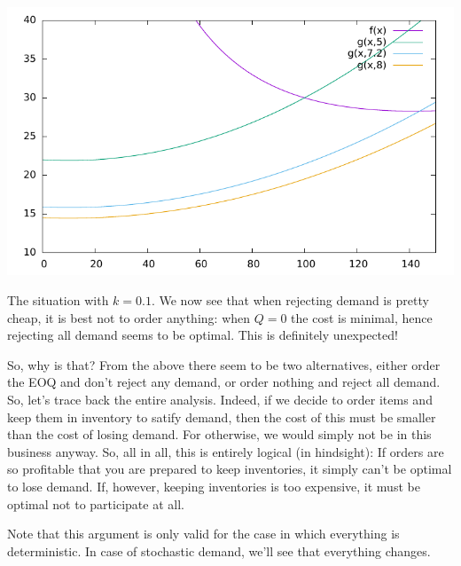 \begin{question}
\begin{solution}
\begin{center}
  \includegraphics{figures/eoq_loss_0_1}
\end{center}

The situation with $k=0.1$. We now see that when rejecting demand is
pretty cheap, it is best not to order anything: when $Q=0$ the cost is
minimal, hence rejecting all demand seems to be optimal. This is
definitely unexpected!

So, why is that? From the above there seem to be two alternatives,
either order the EOQ and don't reject any demand, or order nothing and
reject all demand.  So, let's trace back the entire analysis.  Indeed,
if we decide to order items and keep them in inventory to satify
demand, then the cost of this must be smaller than the cost of losing
demand. For otherwise, we would simply not be in this business
anyway. So, all in all, this is entirely logical (in hindsight): If
orders are so profitable that you are prepared to keep inventories, it
simply can't be optimal to lose demand. If, however, keeping
inventories is too expensive, it must be optimal not to participate at
all.

Note that this argument is only valid for the case in which everything
is deterministic. In case of stochastic demand, we'll see that
everything changes.




  \end{solution}
\end{question}


